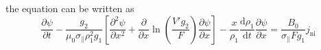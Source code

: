 the equation can be written as
\begin{equation}
\frac{{\partial \psi }}{{\partial t}} - \frac{{{g_2}}}{{{\mu _0}{\sigma _\parallel }\rho _{\text{1}}^2{g_1}}}\left[ {\frac{{{\partial ^2}\psi }}{{\partial {x^2}}} + \frac{\partial }{{\partial x}}\ln \left( {\frac{{V'{g_2}}}{F}} \right)\frac{{\partial \psi }}{{\partial x}}} \right] - \frac{x}{{{\rho _1}}}\frac{{{\text{d}}{\rho _1}}}{{{\text{d}}t}}\frac{{\partial \psi }}{{\partial x}} = \frac{{{B_0}}}{{{\sigma _\parallel }F{g_1}}}{j_{{\text{ni}}}}
\end{equation}

